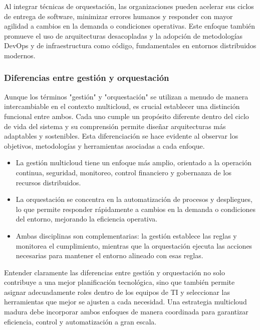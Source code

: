 {                Al integrar técnicas de orquestación, las organizaciones pueden acelerar sus ciclos de entrega de software, minimizar errores humanos y responder con mayor agilidad a cambios en la demanda o condiciones operativas. Este enfoque también promueve el uso de arquitecturas desacopladas y la adopción de metodologías DevOps y de infraestructura como código, fundamentales en entornos distribuidos modernos.
                
            \subsubsection{Diferencias entre gestión y orquestación}
                Aunque los términos "gestión" y "orquestación" se utilizan a menudo de manera intercambiable en el contexto multicloud, es crucial establecer una distinción funcional entre ambos. Cada uno cumple un propósito diferente dentro del ciclo de vida del sistema y su comprensión permite diseñar arquitecturas más adaptables y sostenibles. Esta diferenciación se hace evidente al observar los objetivos, metodologías y herramientas asociadas a cada enfoque.

                \begin{itemize}
                    \item La gestión multicloud tiene un enfoque más amplio, orientado a la operación continua, seguridad, monitoreo, control financiero y gobernanza de los recursos distribuidos.
                    \item La orquestación se concentra en la automatización de procesos y despliegues, lo que permite responder rápidamente a cambios en la demanda o condiciones del entorno, mejorando la eficiencia operativa.
                    \item Ambas disciplinas son complementarias: la gestión establece las reglas y monitorea el cumplimiento, mientras que la orquestación ejecuta las acciones necesarias para mantener el entorno alineado con esas reglas.
                \end{itemize}

                Entender claramente las diferencias entre gestión y orquestación no solo contribuye a una mejor planificación tecnológica, sino que también permite asignar adecuadamente roles dentro de los equipos de TI y seleccionar las herramientas que mejor se ajusten a cada necesidad. Una estrategia multicloud madura debe incorporar ambos enfoques de manera coordinada para garantizar eficiencia, control y automatización a gran escala.

}
